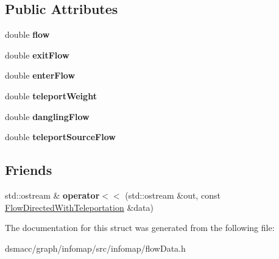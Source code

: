 \subsection*{Public Attributes}
\begin{DoxyCompactItemize}
\item 
\mbox{\label{structFlowDirectedWithTeleportation_a648f4ffec528c66d5722403126dfac9b}} 
double {\bfseries flow}
\item 
\mbox{\label{structFlowDirectedWithTeleportation_a862e121f7672aa10235459603340ba3c}} 
double {\bfseries exit\+Flow}
\item 
\mbox{\label{structFlowDirectedWithTeleportation_a7c88d2e0c58e2304ee25e7b431ace0c9}} 
double {\bfseries enter\+Flow}
\item 
\mbox{\label{structFlowDirectedWithTeleportation_a127709d448b0271ba6fc31f9b58cf3af}} 
double {\bfseries teleport\+Weight}
\item 
\mbox{\label{structFlowDirectedWithTeleportation_a26b40155715d66837d74117669bc422a}} 
double {\bfseries dangling\+Flow}
\item 
\mbox{\label{structFlowDirectedWithTeleportation_a2a5e30eb62da6381b5ebfaa62500560c}} 
double {\bfseries teleport\+Source\+Flow}
\end{DoxyCompactItemize}
\subsection*{Friends}
\begin{DoxyCompactItemize}
\item 
\mbox{\label{structFlowDirectedWithTeleportation_a642fb70226e4fd67662bcaf6014a8f2d}} 
std\+::ostream \& {\bfseries operator$<$$<$} (std\+::ostream \&out, const \mbox{\hyperlink{structFlowDirectedWithTeleportation}{Flow\+Directed\+With\+Teleportation}} \&data)
\end{DoxyCompactItemize}


The documentation for this struct was generated from the following file\+:\begin{DoxyCompactItemize}
\item 
dsmacc/graph/infomap/src/infomap/flow\+Data.\+h\end{DoxyCompactItemize}
